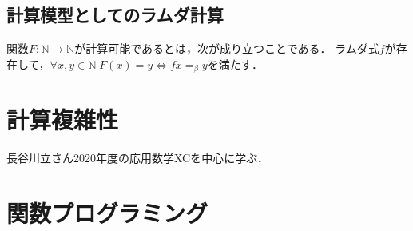 \documentclass[uplatex, dvipdfmx]{jsreport}
\begin{document}
\section{計算模型としてのラムダ計算}

\begin{definition}[computability]
    関数$F:\mathbb{N}\to\mathbb{N}$が計算可能であるとは，次が成り立つことである．
    ラムダ式$f$が存在して，$\forall x,y\in\mathbb{N}\; F(x)=y\Leftrightarrow fx=_\beta y$を満たす．
\end{definition}

\chapter{計算複雑性}
長谷川立さん2020年度の応用数学XCを中心に学ぶ．

\chapter{関数プログラミング}
\end{document}
